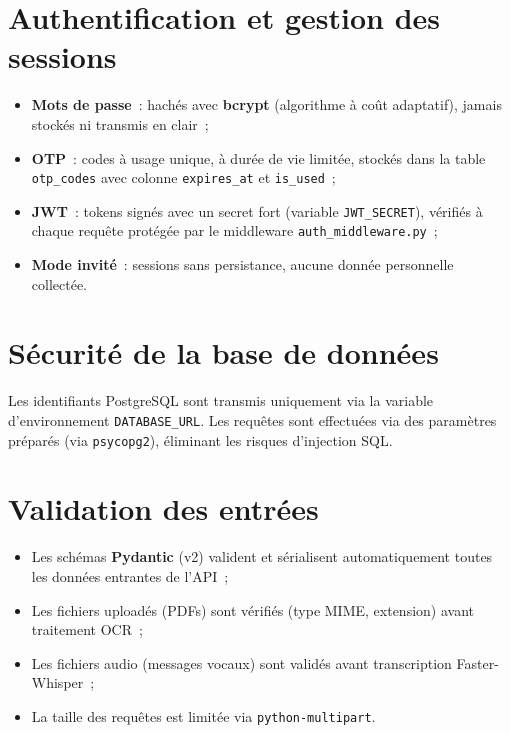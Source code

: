 \documentclass[12pt,a4paper]{report}
\begin{document}
\section{Authentification et gestion des sessions}

\begin{itemize}[label=\textbullet]
    \item \textbf{Mots de passe}~: hachés avec \textbf{bcrypt} (algorithme à coût adaptatif), jamais stockés ni transmis en clair~;
    \item \textbf{OTP}~: codes à usage unique, à durée de vie limitée, stockés dans la table \texttt{otp\_codes} avec colonne \texttt{expires\_at} et \texttt{is\_used}~;
    \item \textbf{JWT}~: tokens signés avec un secret fort (variable \texttt{JWT\_SECRET}), vérifiés à chaque requête protégée par le middleware \texttt{auth\_middleware.py}~;
    \item \textbf{Mode invité}~: sessions sans persistance, aucune donnée personnelle collectée.
\end{itemize}

\section{Sécurité de la base de données}

Les identifiants PostgreSQL sont transmis uniquement via la variable d'environnement \texttt{DATABASE\_URL}. Les requêtes sont effectuées via des paramètres préparés (via \texttt{psycopg2}), éliminant les risques d'injection SQL.

\section{Validation des entrées}

\begin{itemize}[label=\textbullet]
    \item Les schémas \textbf{Pydantic} (v2) valident et sérialisent automatiquement toutes les données entrantes de l'API~;
    \item Les fichiers uploadés (PDFs) sont vérifiés (type MIME, extension) avant traitement OCR~;
    \item Les fichiers audio (messages vocaux) sont validés avant transcription Faster-Whisper~;
    \item La taille des requêtes est limitée via \texttt{python-multipart}.
\end{itemize}
\end{document}
